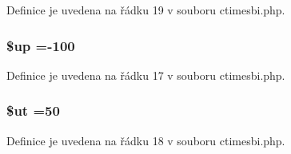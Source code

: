 Definice je uvedena na řádku 19 v souboru ctimesbi.\-php.

\hypertarget{ctimesbi_8php_a6b5ad2ac55f9df46e8f34e78fbd6f176}{
\subsubsection[{\$up}]{\setlength{\rightskip}{0pt plus 5cm}\$up =-\/100}}\label{ctimesbi_8php_a6b5ad2ac55f9df46e8f34e78fbd6f176}


Definice je uvedena na řádku 17 v souboru ctimesbi.\-php.

\hypertarget{ctimesbi_8php_aadd3f841051043ee58e587e840e8dd0b}{
\subsubsection[{\$ut}]{\setlength{\rightskip}{0pt plus 5cm}\$ut =50}}\label{ctimesbi_8php_aadd3f841051043ee58e587e840e8dd0b}


Definice je uvedena na řádku 18 v souboru ctimesbi.\-php.

